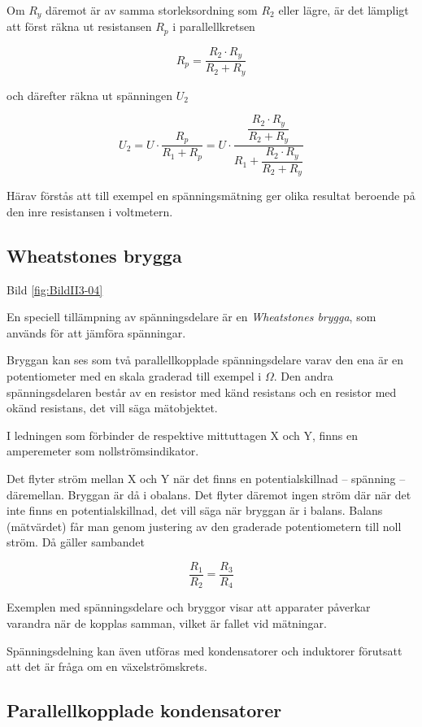 Om \(R_y\) däremot är av samma storleksordning som \(R_2\) eller lägre, är det lämpligt att först räkna ut resistansen \(R_p\) i parallellkretsen 

\[
R_p = \frac{R_2 \cdot R_y}{R_2 + R_y}
\]

och därefter räkna ut spänningen \(U_2\) 

\[
U_2 = U \cdot \dfrac{ R_p }{ R_1 + R_p } = U \cdot \dfrac{ \dfrac{R_2 \cdot R_y}{R_2 + R_y} }{ R_1 + \dfrac{R_2 \cdot R_y}{R_2 + R_y} }
\]

Härav förstås att till exempel en spänningsmätning ger olika resultat beroende
på den inre resistansen i voltmetern.

\subsection{Wheatstones brygga}


Bild \ref{fig:BildII3-04}

En speciell tillämpning av spänningsdelare är en \emph{Wheatstones brygga},
som används för att jämföra spänningar.

Bryggan kan ses som två parallellkopplade spänningsdelare varav den ena är en
potentiometer med en skala graderad till exempel i \(\Omega\).
Den andra spänningsdelaren består av en resistor med känd resistans och en
resistor med okänd resistans, det vill säga mätobjektet.

I ledningen som förbinder de respektive mittuttagen X och Y, finns en
amperemeter som nollströmsindikator.

Det flyter ström mellan X och Y när det finns en potentialskillnad -- spänning
-- däremellan.
Bryggan är då i obalans.
Det flyter däremot ingen ström där när det inte finns en potentialskillnad,
det vill säga när bryggan är i balans.
Balans (mätvärdet) får man genom justering av den graderade potentiometern
till noll ström.
Då gäller sambandet

\[\frac{R_1}{R_2} = \frac{R_3}{R_4}\]

Exemplen med spänningsdelare och bryggor visar att apparater påverkar varandra
när de kopplas samman, vilket är fallet vid mätningar.

Spänningsdelning kan även utföras med kondensatorer och induktorer förutsatt att
det är fråga om en växelströmskrets.

\subsection{Parallellkopplade kondensatorer}
\label{parallellkopplade kondensatorer}

